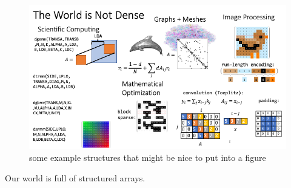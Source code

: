 \begin{figure}
	\includegraphics[width=\linewidth]{example_structures.png}
    \caption{some example structures that might be nice to put into a figure}
\end{figure}
Our world is full of structured arrays.
%

